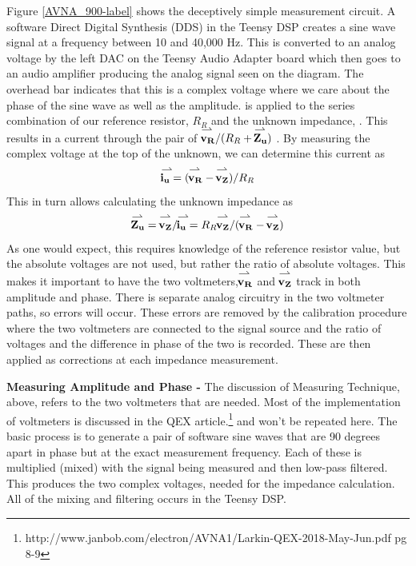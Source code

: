 %
Figure \ref{AVNA_900-label} shows the deceptively simple measurement circuit.  A software Direct Digital Synthesis (DDS) in the Teensy DSP creates a sine wave signal at a frequency between 10 and 40,000 Hz.  This is converted to an analog voltage by the left DAC on the Teensy Audio Adapter board which then goes to an audio amplifier producing the analog signal   seen on the diagram.
The overhead bar indicates that this is a complex voltage where we care about the phase of the sine wave as well as the amplitude.   is applied to the series combination of our reference resistor, \(R_R\) and the unknown impedance, .  This results in a current through the pair  of \(\vecr{$\mathbf{v_R}$}  /  (R_R +   \vecr{$\mathbf{Z_u}$})\) .  By measuring the complex voltage at the top of the unknown,  we can determine this current as
\begin{equation}
 \vecr{$\mathbf{i_u}$}=(\vecr{$\mathbf{v_R}$}-\vecr{$\mathbf{v_Z}$})/R_R
\end{equation}
 This in turn allows calculating the unknown impedance as
\begin{equation}
\vecr{$\mathbf{Z_u}$} =\vecr{$\mathbf{v_Z}$}/\vecr{$\mathbf{i_u}$}
                    =R_R\vecr{$\mathbf{v_Z}$}/(\vecr{$\mathbf{v_R}$}-\vecr{$\mathbf{v_Z}$})
\end{equation}
As one would expect, this requires knowledge of the reference resistor value, but the absolute voltages are not used, but rather the ratio of absolute voltages.  This makes it important to have the two voltmeters,\( \vecr{$\mathbf{v_R}$}\) and \( \vecr{$\mathbf{v_Z}$}\) track in both amplitude and phase.  There is separate analog circuitry in the two voltmeter paths, so errors will occur.  These errors are removed by the calibration procedure where the two voltmeters are connected to the signal source and the ratio  of voltages and the difference in phase of the two is recorded. These are then applied as corrections at each impedance measurement.

\textbf{Measuring Amplitude and Phase - }The discussion of Measuring Technique, above, refers to the two voltmeters that are needed.  Most of the  implementation of voltmeters is discussed in the QEX article.\footnote{http://www.janbob.com/electron/AVNA1/Larkin-QEX-2018-May-Jun.pdf pg 8-9}
%
and won't be repeated here.  The basic process is to generate a pair of software sine waves that are 90 degrees apart in phase but at the exact measurement frequency.  Each of these is multiplied (mixed) with the signal being measured and then low-pass filtered.  This produces the two complex voltages, needed for the impedance calculation.  All of the mixing and filtering occurs in the Teensy DSP.